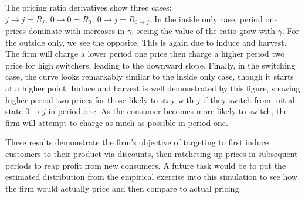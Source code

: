 \documentclass[11pt]{article}
\begin{document}
The pricing ratio derivatives show three cases: $j\rightarrow j = R_j, \ 0\rightarrow0 = R_0, \ 0\rightarrow j = R_{0\rightarrow j}$. In the inside only case, period one prices dominate with increases in $\gamma$, seeing the value of the ratio grow with $\gamma$. For the outside only, we see the opposite. This is again due to induce and harvest. The firm will charge a lower period one price then charge a higher period two price for high switchers, leading to the downward slope. Finally, in the switching case, the curve looks remarkably similar to the inside only case, though it starts at a higher point. Induce and harvest is well demonstrated by this figure, showing higher period two prices for those likely to stay with $j$ if they switch from initial state $0\rightarrow j$ in period one. As the consumer becomes more likely to switch, the firm will attempt to charge as much as possible in period one. 

These results demonstrate the firm's objective of targeting to first induce customers to their product via discounts, then ratcheting up prices in subsequent periods to reap profit from new consumers. A future task would be to put the estimated distribution from the empirical exercise into this simulation to see how the firm would actually price and then compare to actual pricing.
\end{document}

